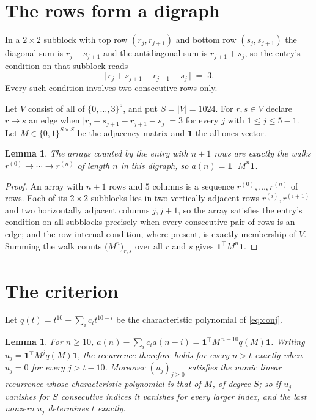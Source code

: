 \documentclass[11pt,a4paper]{article}
\theoremstyle{plain}
\newtheorem{lemma}[theorem]{Lemma}
\theoremstyle{definition}
\begin{document}
\section{The rows form a digraph}

In a $2\times2$ subblock with top row $(r_j,r_{j+1})$ and bottom row $(s_j,s_{j+1})$ the
diagonal sum is $r_j+s_{j+1}$ and the antidiagonal sum is $r_{j+1}+s_j$, so the entry's
condition on that subblock reads
\[
\bigl|\,r_j+s_{j+1}-r_{j+1}-s_j\,\bigr|\;=\;3.
\]
Every such condition involves two consecutive rows only.

Let $V$ consist of all of $\{0,\dots,3\}^{5}$, and put $S=|V|=1024$. For $r,s\in V$ declare $r\to s$ an edge
when $\bigl|r_j+s_{j+1}-r_{j+1}-s_j\bigr|=3$ for every $j$ with
$1\le j\le5-1$. Let $M\in\{0,1\}^{S\times S}$ be the adjacency matrix and $\mathbf{1}$
the all-ones vector.

\begin{lemma}\label{lem:walk}
The arrays counted by the entry with $n+1$ rows are exactly the walks
$r^{(0)}\to\cdots\to r^{(n)}$ of length $n$ in this digraph, so
$a(n)=\mathbf{1}^{\!\top}M^{n}\mathbf{1}$.
\end{lemma}

\begin{proof}
An array with $n+1$ rows and $5$ columns is a sequence $r^{(0)},\dots,r^{(n)}$ of
rows. Each of its $2\times2$ subblocks lies in two vertically adjacent rows
$r^{(i)},r^{(i+1)}$ and two horizontally adjacent columns $j,j+1$, so the array satisfies
the entry's condition on all subblocks precisely when every consecutive pair of rows is an
edge; and the row-internal condition, where present, is exactly membership of $V$. Summing
the walk counts $\bigl(M^{n}\bigr)_{r,s}$ over all $r$ and $s$ gives
$\mathbf{1}^{\!\top}M^{n}\mathbf{1}$.
\end{proof}

\section{The criterion}

Let $q(t)=t^{10}-\sum_i c_i t^{10-i}$ be the characteristic polynomial of
\eqref{eq:conj}.

\begin{lemma}\label{lem:crit}
For $n\ge10$,
$a(n)-\sum_i c_i a(n-i)=\mathbf{1}^{\!\top}M^{\,n-10}q(M)\mathbf{1}$. Writing
$u_j=\mathbf{1}^{\!\top}M^{j}q(M)\mathbf{1}$, the recurrence therefore holds for every
$n>t$ exactly when $u_j=0$ for every $j>t-10$. Moreover $(u_j)_{j\ge0}$ satisfies the
monic linear recurrence whose characteristic polynomial is that of $M$, of degree $S$; so
if $u_j$ vanishes for $S$ consecutive indices it vanishes for every larger index, and the
last nonzero $u_j$ determines $t$ exactly.
\end{lemma}
\end{document}
